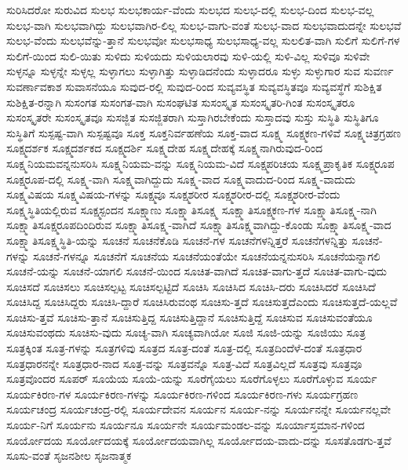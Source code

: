 {ಸುರಿಸಿದರೋ
ಸುರುವಿದ
ಸುಲಭ
ಸುಲಭಕಾರ್ಯ-ವೆಂದು
ಸುಲಭದ
ಸುಲಭ-ದಲ್ಲಿ
ಸುಲಭ-ದಿಂದ
ಸುಲಭ-ವಲ್ಲ
ಸುಲಭ-ವಾಗಿ
ಸುಲಭವಾಗಿದ್ದು
ಸುಲಭವಾಗಿರ-ಲಿಲ್ಲ
ಸುಲಭ-ವಾಗು-ವಂತೆ
ಸುಲಭ-ವಾದ
ಸುಲಭವಾದುದನ್ನೇ
ಸುಲಭವೆ
ಸುಲಭ-ವೆಂದು
ಸುಲಭವೆನ್ನು-ತ್ತಾನೆ
ಸುಲಭವೋ
ಸುಲಭಸಾಧ್ಯ
ಸುಲಭಸಾಧ್ಯ-ವಲ್ಲ
ಸುಲಲಿತ-ವಾಗಿ
ಸುಲಿಗೆ
ಸುಲಿಗೆ-ಗಳ
ಸುಲಿಗೆ-ಯಿಂದ
ಸುಲಿ-ಯಿತು
ಸುಳಿದು
ಸುಳಿಯದು
ಸುಳಿಯಲಾರವು
ಸುಳಿ-ಯಲ್ಲಿ
ಸುಳಿ-ವಿಲ್ಲ
ಸುಳಿವೂ
ಸುಳಿವೇ
ಸುಳ್ಳನ್ನೂ
ಸುಳ್ಳನ್ನೇ
ಸುಳ್ಳಲ್ಲ
ಸುಳ್ಳಾಗಲು
ಸುಳ್ಳಾಗಿತ್ತು
ಸುಳ್ಳಾಡಿದನೆಂದು
ಸುಳ್ಳಾದರೂ
ಸುಳ್ಳು
ಸುಳ್ಳುಗಾರ
ಸುವ
ಸುವರ್ಣ
ಸುವರ್ಣಾವಕಾಶ
ಸುವಾಸನೆಯೂ
ಸುವುದ-ರಲ್ಲಿ
ಸುವುದ-ರಿಂದ
ಸುವ್ಯವಸ್ಥಿತ
ಸುವ್ಯವಸ್ಥಿತವೂ
ಸುವ್ಯವಸ್ಥೆಗೆ
ಸುಶಿಕ್ಷಿತ
ಸುಶಿಕ್ಷಿತ-ರನ್ನಾಗಿ
ಸುಸಂಗತ
ಸುಸಂಗತ-ವಾಗಿ
ಸುಸಂಘಟಿತ
ಸುಸಂಸ್ಕೃತ
ಸುಸಂಸ್ಕೃತರಿ-ಗಿಂತ
ಸುಸಂಸ್ಕೃತರೂ
ಸುಸಂಸ್ಕೃತರೇ
ಸುಸಂಸ್ಕೃತವೂ
ಸುಸಜ್ಜಿತ
ಸುಸಜ್ಜಿತರಾಗಿ
ಸುಸ್ತಾಗಿರಬೇಕೆಂದು
ಸುಸ್ತಾದವು
ಸುಸ್ತು
ಸುಸ್ಥಿತಿ
ಸುಸ್ಥಿತಿಗೂ
ಸುಸ್ಥಿತಿಗೆ
ಸುಸ್ಪಷ್ಟ-ವಾಗಿ
ಸುಸ್ಪಷ್ಟವೂ
ಸೂಕ್ತ
ಸೂಕ್ತನಿರ್ವಹಣೆಯ
ಸೂಕ್ತ-ವಾದ
ಸೂಕ್ಷ್ಮ
ಸೂಕ್ಷ್ಮಕಣ-ಗಳಿವೆ
ಸೂಕ್ಷ್ಮಚಿತ್ರಗ್ರಹಣ
ಸೂಕ್ಷ್ಮದರ್ಶಕ
ಸೂಕ್ಷ್ಮದರ್ಶಕದ
ಸೂಕ್ಷ್ಮದರ್ಶಿ
ಸೂಕ್ಷ್ಮದೇಹ
ಸೂಕ್ಷ್ಮದೇಹಕ್ಕೆ
ಸೂಕ್ಷ್ಮನಾಗಿರುವುದ-ರಿಂದ
ಸೂಕ್ಷ್ಮನಿಯಮವನ್ನನುಸರಿಸಿ
ಸೂಕ್ಷ್ಮನಿಯಮ-ವನ್ನು
ಸೂಕ್ಷ್ಮನಿಯಮ-ವಿದೆ
ಸೂಕ್ಷ್ಮಪರಿಚಯ
ಸೂಕ್ಷ್ಮಪ್ರಾಕೃತಿಕ
ಸೂಕ್ಷ್ಮರೂಪ
ಸೂಕ್ಷ್ಮರೂಪ-ದಲ್ಲಿ
ಸೂಕ್ಷ್ಮ-ವಾಗಿ
ಸೂಕ್ಷ್ಮವಾಗಿದ್ದುದು
ಸೂಕ್ಷ್ಮ-ವಾದ
ಸೂಕ್ಷ್ಮವಾದುದ-ರಿಂದ
ಸೂಕ್ಷ್ಮ-ವಾದುದು
ಸೂಕ್ಷ್ಮವಿಷಯ
ಸೂಕ್ಷ್ಮವಿಷಯ-ಗಳನ್ನು
ಸೂಕ್ಷ್ಮವೂ
ಸೂಕ್ಷ್ಮಶರೀರ
ಸೂಕ್ಷ್ಮಶರೀರ-ದಲ್ಲಿ
ಸೂಕ್ಷ್ಮಶರೀರ-ವೆಂದು
ಸೂಕ್ಷ್ಮಸ್ಥಿತಿಯಲ್ಲಿರುವ
ಸೂಕ್ಷ್ಮಸ್ಪಂದನ
ಸೂಕ್ಷ್ಮಾಣು
ಸೂಕ್ಷ್ಮಾತಿಸೂಕ್ಷ್ಮ
ಸೂಕ್ಷ್ಮಾತಿಸೂಕ್ಷ್ಮಕಣ-ಗಳ
ಸೂಕ್ಷ್ಮಾತಿಸೂಕ್ಷ್ಮ-ನಾಗಿ
ಸೂಕ್ಷ್ಮಾತಿಸೂಕ್ಷ್ಮರೂಪದಿಂದಿರುವ
ಸೂಕ್ಷ್ಮಾತಿಸೂಕ್ಷ್ಮ-ವಾಗಿದೆ
ಸೂಕ್ಷ್ಮಾತಿಸೂಕ್ಷ್ಮವಾಗಿದ್ದು-ಕೊಂಡು
ಸೂಕ್ಷ್ಮಾತಿಸೂಕ್ಷ್ಮ-ವಾದ
ಸೂಕ್ಷ್ಮಾತಿಸೂಕ್ಷ್ಮಸ್ಥಿತಿ-ಯನ್ನು
ಸೂಚನೆ
ಸೂಚನೆಕೊಡಿ
ಸೂಚನೆ-ಗಳ
ಸೂಚನೆಗಳನ್ನಿತ್ತರೆ
ಸೂಚನೆಗಳನ್ನಿತ್ತು
ಸೂಚನೆ-ಗಳನ್ನು
ಸೂಚನೆ-ಗಳನ್ನೂ
ಸೂಚನೆಗೆ
ಸೂಚನೆಯ
ಸೂಚನೆಯಂತೆಯೇ
ಸೂಚನೆಯನ್ನನುಸರಿಸಿ
ಸೂಚನೆಯನ್ನಾಗಲಿ
ಸೂಚನೆ-ಯನ್ನು
ಸೂಚನೆ-ಯಾಗಲಿ
ಸೂಚನೆ-ಯಿಂದ
ಸೂಚಿತ-ವಾಗಿದೆ
ಸೂಚಿತ-ವಾಗು-ತ್ತದೆ
ಸೂಚಿತ-ವಾಗು-ವುದು
ಸೂಚಿಸದೆ
ಸೂಚಿಸಲು
ಸೂಚಿಸಲ್ಪಟ್ಟ
ಸೂಚಿಸಲ್ಪಟ್ಟಿದೆ
ಸೂಚಿಸಿ
ಸೂಚಿಸಿದ
ಸೂಚಿಸಿ-ದರು
ಸೂಚಿಸಿದರೆ
ಸೂಚಿಸಿದೆ
ಸೂಚಿಸಿದ್ದ
ಸೂಚಿಸಿದ್ದರು
ಸೂಚಿಸಿ-ದ್ದಾರೆ
ಸೂಚಿಸಿರುವಂಥ
ಸೂಚಿಸು-ತ್ತದೆ
ಸೂಚಿಸುತ್ತದೆಎಂದು
ಸೂಚಿಸುತ್ತದೆ-ಯಲ್ಲವೆ
ಸೂಚಿಸು-ತ್ತವೆ
ಸೂಚಿಸು-ತ್ತಾನೆ
ಸೂಚಿಸುತ್ತಿದ್ದ
ಸೂಚಿಸುತ್ತಿದ್ದಾನೆ
ಸೂಚಿಸುತ್ತಿದ್ದೆ
ಸೂಚಿಸುವ
ಸೂಚಿಸುವಂತೆಯೂ
ಸೂಚಿಸುವಂಥದು
ಸೂಚಿಸು-ವುದು
ಸೂಚ್ಯ-ವಾಗಿ
ಸೂಚ್ಯವಾಗಿಯೋ
ಸೂಜಿ
ಸೂಜಿ-ಯನ್ನು
ಸೂಜಿಯು
ಸೂತ್ರ
ಸೂತ್ರಕ್ಕಿಂತ
ಸೂತ್ರ-ಗಳನ್ನು
ಸೂತ್ರಗಳಿವು
ಸೂತ್ರದ
ಸೂತ್ರ-ದಂತೆ
ಸೂತ್ರ-ದಲ್ಲಿ
ಸೂತ್ರದಿಂದೆಳೆ-ದಂತೆ
ಸೂತ್ರಧಾರ
ಸೂತ್ರಧಾರನನ್ನೇ
ಸೂತ್ರಧಾರ-ನಾದ
ಸೂತ್ರ-ವನ್ನು
ಸೂತ್ರವನ್ನೊ
ಸೂತ್ರ-ವಿದೆ
ಸೂತ್ರವಿಲ್ಲದೆ
ಸೂತ್ರವು
ಸೂತ್ರವೂ
ಸೂತ್ರವೊಂದರ
ಸೂಪರ್
ಸೂಯೆಯ
ಸೂಯೆ-ಯನ್ನು
ಸೂರೆಗೈಯಲು
ಸೂರೆಗೊಳ್ಳಲು
ಸೂರೆಗೊಳ್ಳುವ
ಸೂರ್ಯ
ಸೂರ್ಯಕಿರಣ-ಗಳ
ಸೂರ್ಯಕಿರಣ-ಗಳನ್ನು
ಸೂರ್ಯಕಿರಣ-ಗಳಿಂದ
ಸೂರ್ಯಕಿರಣ-ಗಳು
ಸೂರ್ಯಗ್ರಹಣ
ಸೂರ್ಯಚಂದ್ರ
ಸೂರ್ಯಚಂದ್ರ-ರಲ್ಲಿ
ಸೂರ್ಯದೇವನ
ಸೂರ್ಯನ
ಸೂರ್ಯ-ನನ್ನು
ಸೂರ್ಯನನ್ನೇ
ಸೂರ್ಯನಲ್ಲವೇ
ಸೂರ್ಯ-ನಿಗೆ
ಸೂರ್ಯನು
ಸೂರ್ಯನೂ
ಸೂರ್ಯನೇ
ಸೂರ್ಯಮಂಡಲ-ವನ್ನು
ಸೂರ್ಯಾಸ್ತಮಾನ-ಗಳಿಂದ
ಸೂರ್ಯೋದಯ
ಸೂರ್ಯೋದಯಕ್ಕೆ
ಸೂರ್ಯೋದಯವಾಗಿಲ್ಲ
ಸೂರ್ಯೋದಯ-ವಾದು-ದನ್ನು
ಸೂಸತೊಡಗು-ತ್ತವೆ
ಸೂಸು-ವಂತೆ
ಸೃಜನಶೀಲ
ಸೃಜನಾತ್ಮಕ
}

